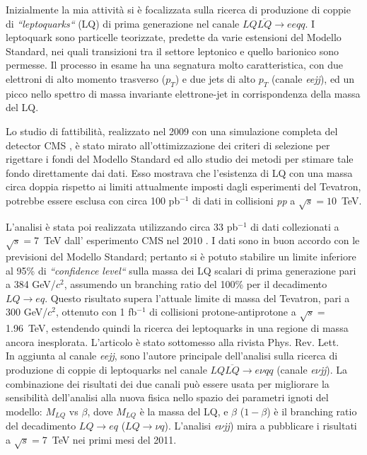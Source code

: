 \documentclass[10pt, a4paper]{article}
\begin{document}
Inizialmente la mia attivit\`a si \`e focalizzata sulla ricerca 
di produzione di coppie di {\it ``leptoquarks``} (LQ) di prima generazione nel canale $LQ\overline{LQ} \rightarrow ee qq$. 
I leptoquark sono particelle teorizzate, predette da varie estensioni del Modello Standard, nei quali transizioni tra il settore leptonico 
e quello barionico sono permesse. Il processo in esame ha una segnatura molto caratteristica, con due elettroni di alto momento 
trasverso ($p_T$) e due jets di alto $p_T$ (canale {\it eejj}), ed un picco nello spettro di massa invariante elettrone-jet in corrispondenza 
della massa del LQ. 

Lo studio di fattibilit\`a, realizzato nel 2009 con una simulazione completa del detector CMS \cite{EXO-08-010,AN-2008-070}, 
\`e stato mirato all'ottimizzazione dei criteri di selezione per rigettare i fondi del Modello Standard ed allo studio dei metodi per stimare tale 
fondo direttamente dai dati. Esso mostrava che l'esistenza di LQ con una massa circa doppia rispetto ai limiti attualmente imposti dagli esperimenti 
del Tevatron, potrebbe essere esclusa con circa 100 pb$^{-1}$ di dati in collisioni {\it pp} a $\sqrt{s}=10$~TeV. 

L'analisi \`e stata poi realizzata utilizzando circa 33 pb$^{-1}$ di dati collezionati a $\sqrt{s}=$7~TeV dall' esperimento CMS nel 2010 
\cite{Khachatryan:2010mp,EXO-10-005,AN-2010-230}. 
I dati sono in buon accordo con le previsioni del Modello Standard; pertanto si \`e potuto stabilire un limite inferiore al 95\% di {\it ``confidence level``} 
sulla massa dei LQ scalari di prima generazione pari a 384 GeV/$c^2$, assumendo un branching ratio del 100\% per il decadimento $LQ\rightarrow eq$. 
Questo risultato supera l'attuale limite di massa del Tevatron, pari a 300 GeV/$c^2$, ottenuto con 1 fb$^{-1}$ di collisioni 
protone-antiprotone a $\sqrt{s}=$1.96~TeV, estendendo quindi la ricerca dei leptoquarks in una regione di massa ancora inesplorata. 
L'articolo \`e stato sottomesso alla rivista Phys. Rev. Lett. \\

In aggiunta al canale {\it eejj}, sono l'autore principale dell'analisi sulla ricerca di produzione di coppie di leptoquarks nel canale 
$LQ\overline{LQ} \rightarrow e\nu qq$ \cite{AN-2010-361} (canale {\it e$\nu$jj}).
La combinazione dei risultati dei due canali pu\`o essere usata per migliorare la 
sensibilit\`a dell'analisi alla nuova fisica nello spazio dei parametri ignoti del modello: $M_{LQ}$ vs $\beta$, 
dove $M_{LQ}$  \`e la massa del LQ, e $\beta$ ($1-\beta$) \`e il branching ratio del decadimento $LQ\rightarrow eq$ 
($LQ\rightarrow \nu q$). L'analisi {\it e$\nu$jj}) mira a pubblicare i risultati a $\sqrt{s}=$7~TeV nei primi 
mesi del 2011. \\
\end{document}
